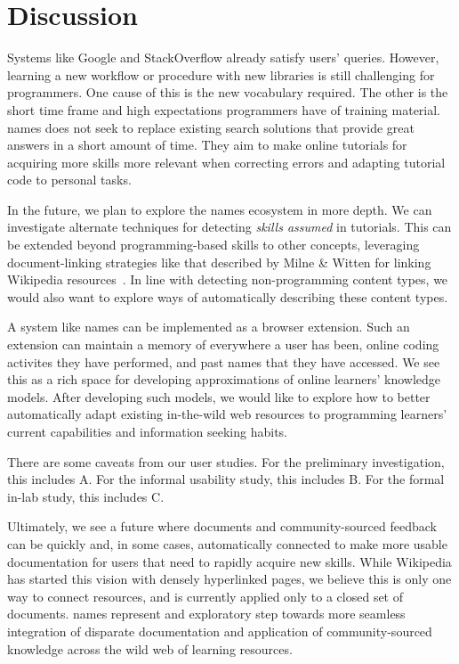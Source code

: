 \section{Discussion}

Systems like Google and StackOverflow already satisfy users' queries.
However, learning a new workflow or procedure with new libraries is still challenging for programmers.
One cause of this is the new vocabulary required.
The other is the short time frame and high expectations programmers have of training material.
\Glspl{name} does not seek to replace existing search solutions that provide great answers in a short amount of time.
They aim to make online tutorials for acquiring more skills more relevant when correcting errors and adapting tutorial code to personal tasks.

In the future, we plan to explore the \Glspl{name} ecosystem in more depth.
We can investigate alternate techniques for detecting \emph{skills assumed} in tutorials.
This can be extended beyond programming-based skills to other concepts, leveraging document-linking strategies like that described by Milne \& Witten for linking Wikipedia resources~\cite{milne_learning_2008}.
In line with detecting non-programming content types, we would also want to explore ways of automatically describing these content types.

A system like \Glspl{name} can be implemented as a browser extension.
Such an extension can maintain a memory of everywhere a user has been, online coding activites they have performed, and past \glspl{name} that they have accessed.
We see this as a rich space for developing approximations of online learners' knowledge models.
After developing such models, we would like to explore how to better automatically adapt existing in-the-wild web resources to programming learners' current capabilities and information seeking habits.

There are some caveats from our user studies.
For the preliminary investigation, this includes A.
For the informal usability study, this includes B.
For the formal in-lab study, this includes C.

Ultimately, we see a future where documents and community-sourced feedback can be quickly and, in some cases, automatically connected to make more usable documentation for users that need to rapidly acquire new skills.
While Wikipedia has started this vision with densely hyperlinked pages, we believe this is only one way to connect resources, and is currently applied only to a closed set of documents.
\Glspl{name} represent and exploratory step towards more seamless integration of disparate documentation and application of community-sourced knowledge across the wild web of learning resources.

